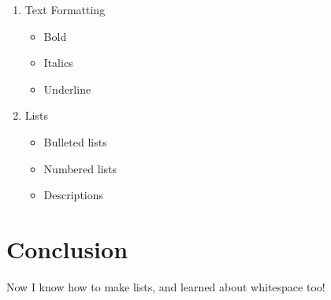 \documentclass{article}
\begin{document}
\begin{enumerate}
	\item Text Formatting

		\begin{itemize}
			\item Bold
			\item Italics
			\item Underline
		\end{itemize}

	\item Lists

		\begin{itemize}
			\item Bulleted lists
			\item Numbered lists
			\item Descriptions
		\end{itemize}

\end{enumerate}


\section{Conclusion}

Now I know how to make lists, and learned about whitespace too!
\end{document}
